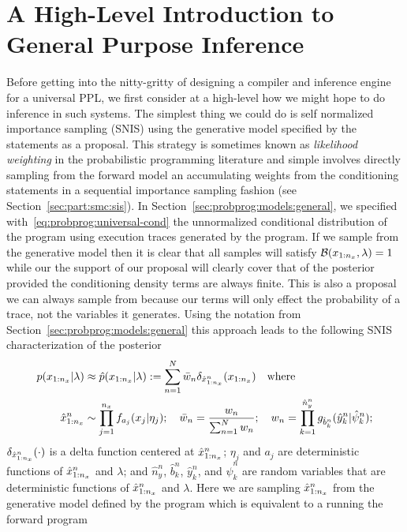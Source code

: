 
\section{A High-Level Introduction to General Purpose Inference}
\label{sec:proginf:high}

Before getting into the nitty-gritty of designing a compiler and inference engine for a universal PPL, we
first consider at a high-level how we might hope to do inference in such systems.  The simplest
thing we could do is self normalized importance sampling (SNIS) using the generative model specified by the \sample
statements as a proposal.  This strategy is sometimes known as \emph{likelihood weighting} in the probabilistic
programming literature and simple involves directly sampling from the forward model an accumulating
weights from the \observe conditioning statements in a sequential importance sampling fashion (see 
Section~\ref{sec:part:smc:sis}).
In Section~\ref{sec:probprog:models:general}, we specified with~\eqref{eq:probprog:universal-cond}
the unnormalized conditional distribution of the program using execution traces generated
by the program.  If we sample from the generative model then it is clear that all samples will satisfy
$\mathcal{B}(x_{1:n_x},\lambda)=1$ while our the support of our proposal will clearly cover that of
the posterior provided the conditioning density terms are always finite.  This is also a proposal
we can always sample from because our \observe terms will only effect the probability of a trace, not
the variables it generates.  Using the notation from Section~\ref{sec:probprog:models:general} 
this approach leads to the following SNIS characterization of the posterior
\begin{align}
p(x_{1:n_x} | \lambda) &\approx \hat{p}(x_{1:n_x} | \lambda) := \sum_{n=1}^{N} \bar w_n \delta_{\hat{x}_{1:n_x}^n} (x_{1:n_x})
\quad \text{where}  \\
\hat{x}_{1:n_x}^n &\sim \prod_{j=1}^{n_x} f_{a_j}(x_j | \eta_j); \quad \bar w_n = \frac{w_n}{\sum_{n=1}^{N} w_n}; \quad
w_n = \prod_{k=1}^{\hat{n}_{y}^n} g_{\hat{b}_{k}^n}(\hat{y}_{k}^n | \hat{\psi}_{k}^n);
\end{align}
$\delta_{\hat{x}_{1:n_x}^n} (\cdot)$ is a delta function centered at $\hat{x}_{1:n_x}^n$; $\eta_j$ and $a_j$ are deterministic functions of $\hat{x}_{1:n_x}^n$ 
and $\lambda$; and $\hat{n}_{y}^n$, $\hat{b}_{k}^n$, $\hat{y}_{k}^n$, and $\hat{\psi}_{k}^n$ are random variables
that are deterministic functions of $\hat{x}_{1:n_x}^n$ and $\lambda$.  Here we are sampling $\hat{x}_{1:n_x}^n$ from
the generative model defined by the program which is equivalent to a running the forward program
